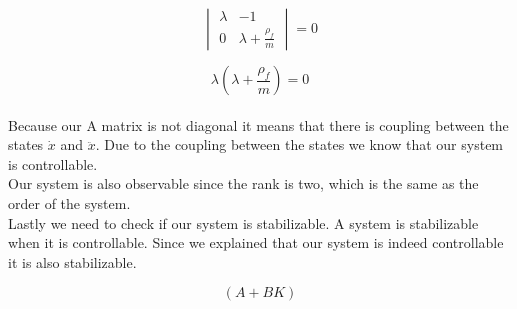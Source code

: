\documentclass[final]{scrreprt} %
\begin{document}
\begin{enumerate}
\begin{equation}
	\begin{vmatrix}
		\lambda & -1 \\
		0 & \lambda + \frac{\rho_f}{m}
	\end{vmatrix} = 0
	\label{eq:fmatrix}
\end{equation}

\begin{equation}
	\lambda(\lambda + \frac{\rho_f}{m}) = 0
	\label{eq:characteristic}
\end{equation}
\\
Because our A matrix is not diagonal it means that there is coupling between the states $\dot{x}$ and $\ddot{x}$. Due to the coupling between the states we know that our system is controllable.\\
Our system is also observable since the rank is two, which is the same as the order of the system.\\
Lastly we need to check if our system is stabilizable. A system is stabilizable when it is controllable. Since we explained that our system is indeed controllable it is also stabilizable.

\begin{equation}
	(A + BK)
\label{eq:K}
\end{equation}


\end{enumerate}
\end{document}
